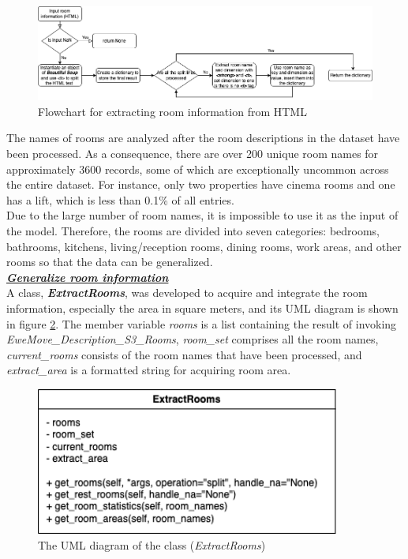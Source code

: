 \documentclass[12pt,twoside]{report}
\begin{document}
\begin{figure}[h]
	\centering
	\includegraphics[width=15cm]{html_room_info}
	\caption{Flowchart for extracting room information from HTML}
	\label{html_room_info}
\end{figure}

The names of rooms are analyzed after the room descriptions in the dataset have been processed. As a consequence, there are over 200 unique room names for approximately 3600 records, some of which are exceptionally uncommon across the entire dataset. For instance, only two properties have cinema rooms and one has a lift, which is less than 0.1\% of all entries.  
\\

Due to the large number of room names, it is impossible to use it as the input of the model. Therefore, the rooms are divided into seven categories: bedrooms, bathrooms, kitchens, living/reception rooms, dining rooms, work areas, and other rooms so that the data can be generalized. 
\\

\textbf{\textit{\underline{Generalize room information}}} \\
A class, \textit{\textbf{ExtractRooms}}, was developed to acquire and integrate the room information, especially the area in square meters, and its UML diagram is shown in figure \ref{uml_extract_rooms}. The member variable \textit{rooms} is a list containing the result of invoking \textit{EweMove\_Description\_S3\_Rooms}, \textit{room\_set} comprises all the room names, \textit{current\_rooms} consists of the room names that have been processed, and \textit{extract\_area} is a formatted string for acquiring room area. 
\\

\begin{figure}[h]
	\centering
	\includegraphics[width=10cm]{uml_extract_rooms}
	\caption{The UML diagram of the class (\textit{ExtractRooms})}
	\label{uml_extract_rooms}
\end{figure}
\end{document}
